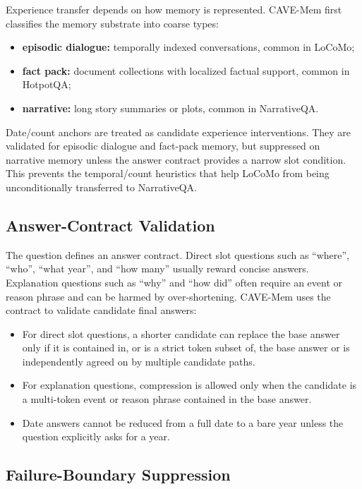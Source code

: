 \documentclass[11pt]{article}
\newcommand{\method}{CAVE-Mem}
\begin{document}
Experience transfer depends on how memory is represented. \method{} first
classifies the memory substrate into coarse types:

\begin{itemize}[leftmargin=*]
  \item \textbf{episodic dialogue:} temporally indexed conversations, common in
  LoCoMo;
  \item \textbf{fact pack:} document collections with localized factual
  support, common in HotpotQA;
  \item \textbf{narrative:} long story summaries or plots, common in
  NarrativeQA.
\end{itemize}

Date/count anchors are treated as candidate experience interventions. They are
validated for episodic dialogue and fact-pack memory, but suppressed on
narrative memory unless the answer contract provides a narrow slot condition.
This prevents the temporal/count heuristics that help LoCoMo from being
unconditionally transferred to NarrativeQA.

\subsection{Answer-Contract Validation}

The question defines an answer contract. Direct slot questions such as
``where'', ``who'', ``what year'', and ``how many'' usually reward concise
answers. Explanation questions such as ``why'' and ``how did'' often require an
event or reason phrase and can be harmed by over-shortening. \method{} uses the
contract to validate candidate final answers:

\begin{itemize}[leftmargin=*]
  \item For direct slot questions, a shorter candidate can replace the base
  answer only if it is contained in, or is a strict token subset of, the base
  answer or is independently agreed on by multiple candidate paths.
  \item For explanation questions, compression is allowed only when the
  candidate is a multi-token event or reason phrase contained in the base
  answer.
  \item Date answers cannot be reduced from a full date to a bare year unless
  the question explicitly asks for a year.
\end{itemize}

\subsection{Failure-Boundary Suppression}
\end{document}
